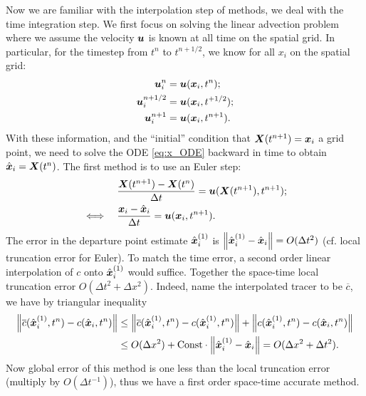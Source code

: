 \documentclass[11pt,letterpaper]{article}
\begin{document}
Now we are familiar with the interpolation step of \sml\;methods, we deal with the time integration step. We first focus on solving the linear advection problem where we assume the velocity $\boldsymbol{u}$ is known at all time on the spatial grid. In particular, for the timestep from $t^n$ to $t^{n+1/2}$, we know for all $x_i$ on the spatial grid:
\begin{align*}
    \boldsymbol{u}_i^{n} &= \boldsymbol{u}(\boldsymbol{x}_i,t^n);\\
    \boldsymbol{u}_i^{n+1/2} &= \boldsymbol{u}(\boldsymbol{x}_i,t^{+1/2});\\
    \boldsymbol{u}_i^{n+1} &= \boldsymbol{u}(\boldsymbol{x}_i,t^{n+1}).
\end{align*}
With these information, and the ``initial'' condition that $\boldsymbol{X}(t^{n+1}) = \boldsymbol{x}_i$ a grid point, we need to solve the ODE \eqref{eq:x_ODE} backward in time to obtain $\hat{\boldsymbol{x}}_i = \boldsymbol{X}(t^{n})$. The first method is to use an Euler step:
\begin{align*}
    &\frac{\boldsymbol{X}(t^{n+1})-\boldsymbol{X}(t^{n})}{\Delta t} = \boldsymbol{u}(\boldsymbol{X}(t^{n+1}),t^{n+1});\\
    \iff\quad &\frac{{\boldsymbol{x}}_i-\hat{\boldsymbol{x}}_i}{\Delta t} = \boldsymbol{u}(\boldsymbol{x}_i,t^{n+1}).
\end{align*}
The error in the departure point estimate $\hat{\boldsymbol{x}}^{(1)}_i$ is $\left\Vert \hat{\boldsymbol{x}}^{(1)}_i-\hat{\boldsymbol{x}}_i \right\Vert = O(\Delta t^2)$ (cf. local truncation error for Euler). To match the time error, a second order linear interpolation of $c$ onto $\hat{\boldsymbol{x}}_i^{(1)}$ would suffice. Together the space-time local truncation error $O(\Delta t^2+\Delta x^2)$. Indeed, name the interpolated tracer to be $\overline{c}$, we have by triangular inequality
\begin{align*}
    \left\Vert \overline{c}(\hat{\boldsymbol{x}}^{(1)}_i,t^n)-c(\hat{\boldsymbol{x}}_i,t^n) \right\Vert 
    &\leq \left\Vert \overline{c}(\hat{\boldsymbol{x}}^{(1)}_i,t^n)-{c}(\hat{\boldsymbol{x}}^{(1)}_i,t^n) \right\Vert+\left\Vert {c}(\hat{\boldsymbol{x}}^{(1)}_i,t^n)-c(\hat{\boldsymbol{x}}_i,t^n) \right\Vert\\
    &\leq O(\Delta x^2)+\text{Const}\cdot \left\Vert \hat{\boldsymbol{x}}^{(1)}_i-\hat{\boldsymbol{x}}_i \right\Vert = O(\Delta x^2+\Delta t^2).
\end{align*}
Now global error of this method is one less than the local truncation error (multiply by $O(\Delta t^{-1})$), thus we have a first order space-time accurate method. 
\end{document}
